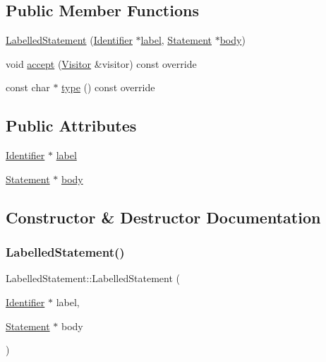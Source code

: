 \subsection*{Public Member Functions}
\begin{DoxyCompactItemize}
\item 
\hyperlink{struct_labelled_statement_aa36aaf969c3e1e4586481d77d646ae7a}{Labelled\+Statement} (\hyperlink{struct_identifier}{Identifier} $\ast$\hyperlink{struct_labelled_statement_aa3cb4a075ce2d599c8e1eca7700100b7}{label}, \hyperlink{struct_statement}{Statement} $\ast$\hyperlink{struct_labelled_statement_a5084b8d01545f2b3a37b036769c55e3a}{body})
\item 
void \hyperlink{struct_labelled_statement_abc283c24da726909de0b3f96b18b7f86}{accept} (\hyperlink{struct_visitor}{Visitor} \&visitor) const override
\item 
const char $\ast$ \hyperlink{struct_labelled_statement_a438e8e7376ab4d319e100dd63c0f2d07}{type} () const override
\end{DoxyCompactItemize}
\subsection*{Public Attributes}
\begin{DoxyCompactItemize}
\item 
\hyperlink{struct_identifier}{Identifier} $\ast$ \hyperlink{struct_labelled_statement_aa3cb4a075ce2d599c8e1eca7700100b7}{label}
\item 
\hyperlink{struct_statement}{Statement} $\ast$ \hyperlink{struct_labelled_statement_a5084b8d01545f2b3a37b036769c55e3a}{body}
\end{DoxyCompactItemize}


\subsection{Constructor \& Destructor Documentation}
\mbox{\label{struct_labelled_statement_aa36aaf969c3e1e4586481d77d646ae7a}} 
\subsubsection{\texorpdfstring{Labelled\+Statement()}{LabelledStatement()}}
{\footnotesize\ttfamily Labelled\+Statement\+::\+Labelled\+Statement (\begin{DoxyParamCaption}\item[{\hyperlink{struct_identifier}{Identifier} $\ast$}]{label,  }\item[{\hyperlink{struct_statement}{Statement} $\ast$}]{body }\end{DoxyParamCaption})\hspace{0.3cm}{\ttfamily [inline]}}



